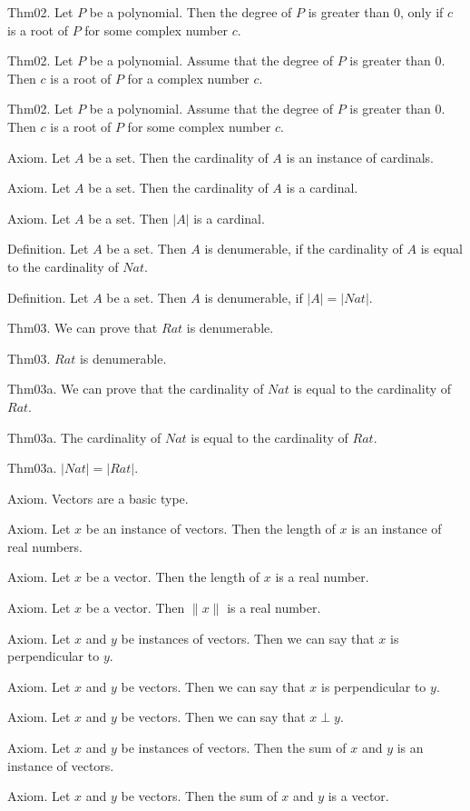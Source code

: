 \documentclass{article}
\begin{document}
Thm02. Let $P$ be a polynomial. Then the degree of $P$ is greater than $0$, only if $c$ is a root of $P$ for some complex number $c$.

Thm02. Let $P$ be a polynomial. Assume that the degree of $P$ is greater than $0$. Then $c$ is a root of $P$ for a complex number $c$.

Thm02. Let $P$ be a polynomial. Assume that the degree of $P$ is greater than $0$. Then $c$ is a root of $P$ for some complex number $c$.

Axiom. Let $A$ be a set. Then the cardinality of $A$ is an instance of cardinals.

Axiom. Let $A$ be a set. Then the cardinality of $A$ is a cardinal.

Axiom. Let $A$ be a set. Then $| A |$ is a cardinal.

Definition. Let $A$ be a set. Then $A$ is denumerable, if the cardinality of $A$ is equal to the cardinality of $Nat$.

Definition. Let $A$ be a set. Then $A$ is denumerable, if $| A | = | Nat |$.

Thm03. We can prove that $Rat$ is denumerable.

Thm03. $Rat$ is denumerable.

Thm03a. We can prove that the cardinality of $Nat$ is equal to the cardinality of $Rat$.

Thm03a. The cardinality of $Nat$ is equal to the cardinality of $Rat$.

Thm03a. $| Nat | = | Rat |$.

Axiom. Vectors are a basic type.

Axiom. Let $x$ be an instance of vectors. Then the length of $x$ is an instance of real numbers.

Axiom. Let $x$ be a vector. Then the length of $x$ is a real number.

Axiom. Let $x$ be a vector. Then $\| x \|$ is a real number.

Axiom. Let $x$ and $y$ be instances of vectors. Then we can say that $x$ is perpendicular to $y$.

Axiom. Let $x$ and $y$ be vectors. Then we can say that $x$ is perpendicular to $y$.

Axiom. Let $x$ and $y$ be vectors. Then we can say that $x \perp y$.

Axiom. Let $x$ and $y$ be instances of vectors. Then the sum of $x$ and $y$ is an instance of vectors.

Axiom. Let $x$ and $y$ be vectors. Then the sum of $x$ and $y$ is a vector.
\end{document}
